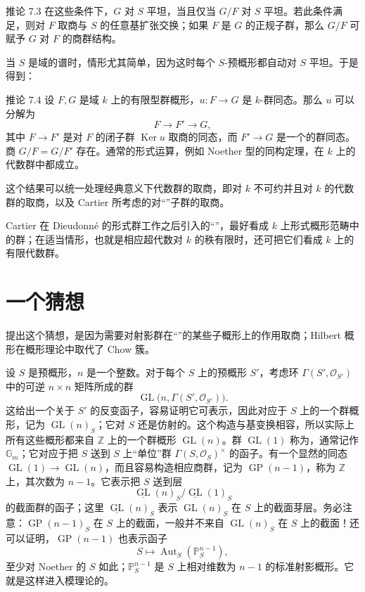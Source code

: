 \begin{statement}{推论 7.3}
在这些条件下，$G$ 对 $S$ 平坦，当且仅当 $G/F$ 对 $S$ 平坦。若此条件满足，则对 $F$ 取商与 $S$ 的任意基扩张交换；如果 $F$ 是 $G$ 的正规子群，那么 $G/F$ 可赋予 $G$ 对 $F$ 的商群结构。
\end{statement}

当 $S$ 是域的谱时，情形尤其简单，因为这时每个 $S$-预概形都自动对 $S$ 平坦。于是得到：

\begin{statement}{推论 7.4}
设 $F,G$ 是域 $k$ 上的有限型群概形，$u:F\to G$ 是 $k$-群同态。那么 $u$ 可以分解为
\[
 F\longrightarrow F'\longrightarrow G,
\]
其中 $F\to F'$ 是对 $F$ 的闭子群 $\operatorname{Ker}u$ 取商的同态，而 $F'\to G$ 是一个的群同态。商 $G/F=G/F'$ 存在。通常的形式运算，例如 Noether 型的同构定理，在 $k$ 上的代数群中都成立。
\end{statement}

这个结果可以统一处理经典意义下代数群的取商，即对 $k$ 不可约并且对 $k$ 的代数群的取商，以及 Cartier 所考虑的对“”子群的取商。

Cartier 在 Dieudonné 的形式群工作之后引入的“”，最好看成 $k$ 上形式概形范畴中的群；在适当情形，也就是相应超代数对 $k$ 的秩有限时，还可把它们看成 $k$ 上的有限代数群。

\section{一个猜想}
提出这个猜想，是因为需要对射影群在“”的某些子概形上的作用取商；Hilbert 概形在概形理论中取代了 Chow 簇。

设 $S$ 是预概形，$n$ 是一个整数。对于每个 $S$ 上的预概形 $S'$，考虑环 $\Gamma(S',\mathcal O_{S'})$ 中的可逆 $n\times n$ 矩阵所成的群
\[
 \operatorname{GL}\bigl(n,\Gamma(S',\mathcal O_{S'})\bigr).
\]
这给出一个关于 $S'$ 的反变函子，容易证明它可表示，因此对应于 $S$ 上的一个群概形，记为 $\operatorname{GL}(n)_S$；它对 $S$ 还是仿射的。这个构造与基变换相容，所以实际上所有这些概形都来自 $\mathbb Z$ 上的一个群概形 $\operatorname{GL}(n)$。群 $\operatorname{GL}(1)$ 称为，通常记作 $\mathbb G_m$；它对应于把 $S$ 送到 $S$ 上“单位”群 $\Gamma(S,\mathcal O_S)^\times$ 的函子。有一个显然的同态 $\operatorname{GL}(1)\to\operatorname{GL}(n)$，而且容易构造相应商群，记为 $\operatorname{GP}(n-1)$，称为 $\mathbb Z$ 上，其次数为 $n-1$。它表示把 $S$ 送到层
\[
 \underline{\operatorname{GL}}(n)_S/
 \underline{\operatorname{GL}}(1)_S
\]
的截面群的函子；这里 $\underline{\operatorname{GL}}(n)_S$ 表示 $\operatorname{GL}(n)_S$ 在 $S$ 上的截面芽层。务必注意：$\operatorname{GP}(n-1)_S$ 在 $S$ 上的截面，一般并不来自 $\operatorname{GL}(n)_S$ 在 $S$ 上的截面！还可以证明，$\operatorname{GP}(n-1)$ 也表示函子
\[
 S\longmapsto\operatorname{Aut}_S(\mathbb P_S^{n-1}),
\]
至少对 Noether 的 $S$ 如此；$\mathbb P_S^{n-1}$ 是 $S$ 上相对维数为 $n-1$ 的标准射影概形。它就是这样进入模理论的。

